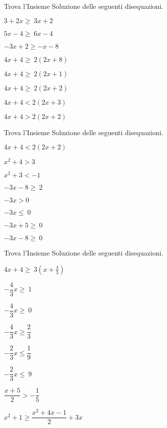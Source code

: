 \begin{esercizio}[\Ast]
 \label{ese:21.11}
Trova l'Insieme Soluzione delle seguenti disequazioni.
 \begin{multicols}{2}
 \begin{enumeratea}
 \item $3+2x\ge~3x+2$
\item $5x-4\ge~6x-4$
\item $-3x+2\ge -x-8$
\item $4x+4\ge~2(2x+8)$
\item $4x+4\ge~2(2x+1)$
\item $4x+4\ge~2(2x+2)$
\item $4x+4<2(2x+3)$
\item $4x+4>2(2x+2)$
\end{enumeratea}
\end{multicols}
\end{esercizio}

\begin{esercizio}[\Ast]
 \label{ese:21.12}
Trova l'Insieme Soluzione delle seguenti disequazioni.
 \begin{multicols}{2}
 \begin{enumeratea}
 \item $4x+4<2(2x+2)$
\item $x^{2}+4>3$
\item $x^{2}+3<-1$
\item $-3x-8\ge~2$
\item $-3x>0$
\item $-3x\le~0$
\item $-3x+5\ge~0$
\item $-3x-8\ge~0$
\end{enumeratea}
\end{multicols}
\end{esercizio}

\newpage
\begin{esercizio}[\Ast]
 \label{ese:21.13}
Trova l'Insieme Soluzione delle seguenti disequazioni.
 \begin{multicols}{2}
 \begin{enumeratea}
 \item $4x+4\ge~3\left(x+\frac{4}{3}\right)$
\item $-{\dfrac{4}{3}}x\ge~1$
\item $-{\dfrac{4}{3}}x\ge~0$
\item $-{\dfrac{4}{3}}x\ge \dfrac{2}{3}$
\item $-{\dfrac{2}{3}}x\le \dfrac{1}{9}$
\item $-{\dfrac{2}{3}}x\le~9$
\item $\dfrac{x+5}{2}>-{\dfrac{1}{5}}$
\item $x^2+1\ge\dfrac{x^2+4x-1}{2}+3x$
\end{enumeratea}
\end{multicols}
\end{esercizio}

